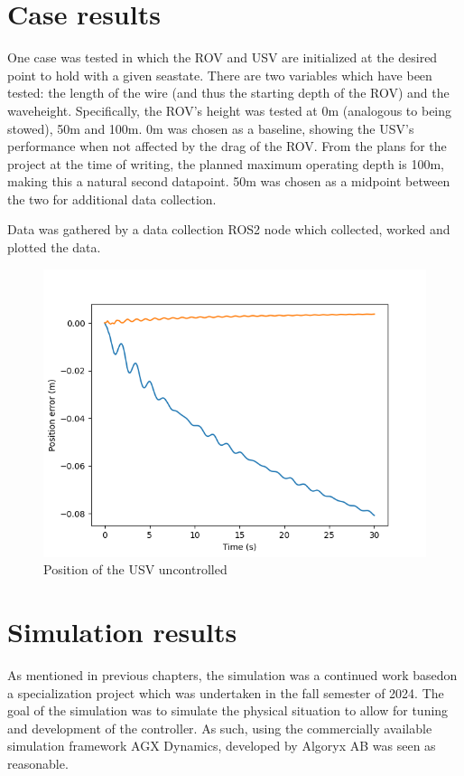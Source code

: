 \documentclass[class=article, crop=false]{standalone}
\begin{document}
\section{Case results}
One case was tested in which the ROV and USV are initialized at the desired point to hold with a given seastate. There are two variables which have been tested: the length of the wire (and thus the starting depth of the ROV) and the waveheight. Specifically, the ROV's height was tested at 0m (analogous to being stowed), 50m and 100m. 0m was chosen as a baseline, showing the USV's performance when not affected by the drag of the ROV. From the plans for the project at the time of writing, the planned maximum operating depth is 100m, making this a natural second datapoint. 50m was chosen as a midpoint between the two for additional data collection.

Data was gathered by a data collection ROS2 node which collected, worked and plotted the data.

\begin{figure}
    \centering
    \includegraphics{scenario1/rov-0m/0.0m/usv_pos_error_uncontrolled}
    \caption{Position of the USV uncontrolled}

\end{figure}

\subsection{}

\section{Simulation results}
As mentioned in previous chapters, the simulation was a continued work basedon a specialization project which was undertaken in the fall semester of 2024. The goal of the simulation was to simulate the physical situation to allow for tuning and development of the controller. As such, using the commercially available simulation framework AGX Dynamics, developed by Algoryx AB was seen as reasonable.
\end{document}
